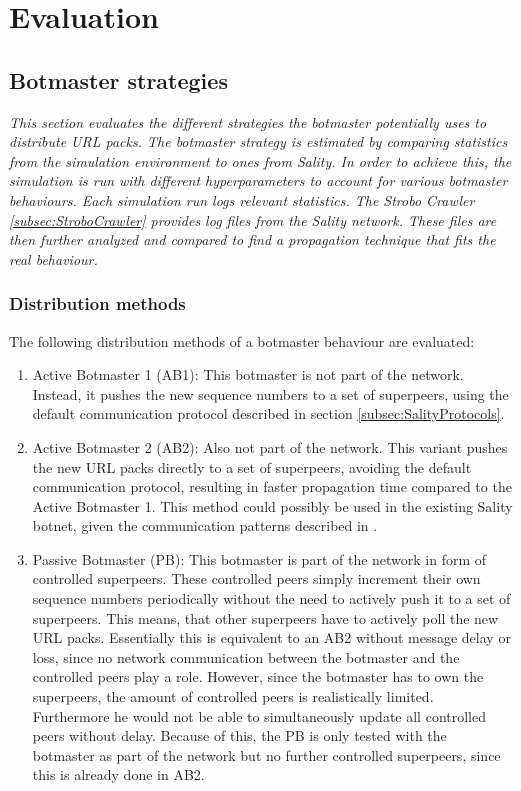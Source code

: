 \documentclass{article}
\begin{document}
\section{Evaluation}

\subsection{Botmaster strategies} \label{sec:BotmasterStrategies}
\emph{This section evaluates the different strategies the botmaster potentially uses to distribute URL packs. The botmaster strategy is estimated by comparing statistics from the simulation environment to ones from Sality. In order to achieve this, the simulation is run with different hyperparameters to account for various botmaster behaviours. Each simulation run logs relevant statistics. The Strobo Crawler \ref{subsec:StroboCrawler} provides log files from the Sality network. These files are then further analyzed and compared to find a propagation technique that fits the real behaviour.}

\subsubsection{Distribution methods} \label{subsec:DistributionMethods}
The following distribution methods of a botmaster behaviour are evaluated:

\begin{enumerate}
    \item Active Botmaster 1 (AB1): This botmaster is not part of the network. Instead, it pushes the new sequence numbers to a set of superpeers, using the default communication protocol described in section \ref{subsec:SalityProtocols}.
    \item Active Botmaster 2 (AB2): Also not part of the network. This variant pushes the new URL packs directly to a set of superpeers, avoiding the default communication protocol, resulting in faster propagation time compared to the Active Botmaster 1. This method could possibly be used in the existing Sality botnet, given the communication patterns described in \cite{AMP2P}.
    \item Passive Botmaster (PB): This botmaster is part of the network in form of controlled superpeers. These controlled peers simply increment their own sequence numbers periodically without the need to actively push it to a set of superpeers. This means, that other superpeers have to actively poll the new URL packs. Essentially this is equivalent to an AB2 without message delay or loss, since no network communication between the botmaster and the controlled peers play a role. However, since the botmaster has to own the superpeers, the amount of controlled peers is realistically limited. Furthermore he would not be able to simultaneously update all controlled peers without delay. Because of this, the PB is only tested with the botmaster as part of the network but no further controlled superpeers, since this is already done in AB2.
\end{enumerate}
\end{document}
